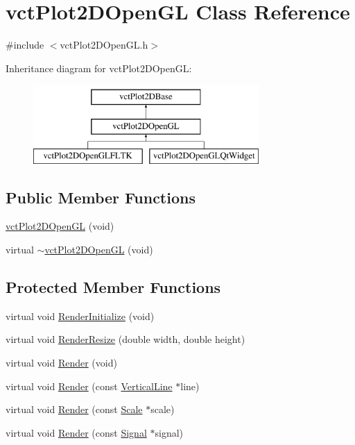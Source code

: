 \hypertarget{classvct_plot2_d_open_g_l}{\section{vct\-Plot2\-D\-Open\-G\-L Class Reference}
\label{classvct_plot2_d_open_g_l}
}


{\ttfamily \#include $<$vct\-Plot2\-D\-Open\-G\-L.\-h$>$}

Inheritance diagram for vct\-Plot2\-D\-Open\-G\-L\-:\begin{figure}[H]
\begin{center}
\leavevmode
\includegraphics[height=3.000000cm]{d5/d42/classvct_plot2_d_open_g_l}
\end{center}
\end{figure}
\subsection*{Public Member Functions}
\begin{DoxyCompactItemize}
\item 
\hyperlink{classvct_plot2_d_open_g_l_a627a06f03f3e076b2f72964ec5bc6adc}{vct\-Plot2\-D\-Open\-G\-L} (void)
\item 
virtual \hyperlink{classvct_plot2_d_open_g_l_a2dc44eb8eda48d9959948255f8d09aeb}{$\sim$vct\-Plot2\-D\-Open\-G\-L} (void)
\end{DoxyCompactItemize}
\subsection*{Protected Member Functions}
{\bf }\par
\begin{DoxyCompactItemize}
\item 
virtual void \hyperlink{classvct_plot2_d_open_g_l_a5e0d758ad4a3506e658d6e01058898a4}{Render\-Initialize} (void)
\item 
virtual void \hyperlink{classvct_plot2_d_open_g_l_a8bfbfcd31901fb734aa87ab40f06b937}{Render\-Resize} (double width, double height)
\item 
virtual void \hyperlink{classvct_plot2_d_open_g_l_a5629e5b685cf44aae8e863966f7ca412}{Render} (void)
\item 
virtual void \hyperlink{classvct_plot2_d_open_g_l_ac8bd8a94389c5524bf36d607d067edce}{Render} (const \hyperlink{classvct_plot2_d_base_1_1_vertical_line}{Vertical\-Line} $\ast$line)
\item 
virtual void \hyperlink{classvct_plot2_d_open_g_l_aa76055d15902aa5c35e9720d167eeab8}{Render} (const \hyperlink{classvct_plot2_d_base_1_1_scale}{Scale} $\ast$scale)
\item 
virtual void \hyperlink{classvct_plot2_d_open_g_l_a951848e293eabef82646de9554ba0892}{Render} (const \hyperlink{classvct_plot2_d_base_1_1_signal}{Signal} $\ast$signal)
\end{DoxyCompactItemize}

